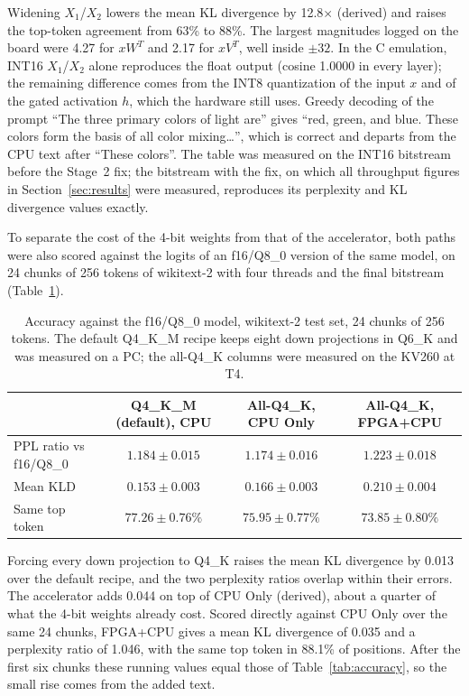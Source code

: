Widening $X_1$/$X_2$ lowers the mean KL divergence by 12.8$\times$ (derived) and raises
the top-token agreement from 63\% to 88\%. The largest magnitudes logged on the board
were 4.27 for $xW^T$ and 2.17 for $xV^T$, well inside $\pm 32$. In the C emulation,
INT16 $X_1$/$X_2$ alone reproduces the float output (cosine 1.0000 in every layer); the
remaining difference comes from the INT8 quantization of the input $x$ and of the gated
activation $h$, which the hardware still uses. Greedy decoding of the prompt ``The three
primary colors of light are'' gives ``red, green, and blue. These colors form the basis
of all color mixing\ldots'', which is correct and departs from the CPU text after
``These colors''. The table was measured on the INT16 bitstream before the Stage~2 fix;
the bitstream with the fix, on which all throughput figures in Section~\ref{sec:results}
were measured, reproduces its perplexity and KL divergence values exactly.

To separate the cost of the 4-bit weights from that of the accelerator, both paths were
also scored against the logits of an f16/Q8\_0 version of the same model, on 24 chunks of
256 tokens of wikitext-2 with four threads and the final bitstream
(Table~\ref{tab:accuracy_ref}).

\begin{table}[htbp]
\centering
\footnotesize
\caption{Accuracy against the f16/Q8\_0 model, wikitext-2 test set, 24 chunks of 256
tokens. The default Q4\_K\_M recipe keeps eight down projections in Q6\_K and was
measured on a PC; the all-Q4\_K columns were measured on the KV260 at T4.}
\label{tab:accuracy_ref}
\begin{tabular}{l c c c}
\hline
 & Q4\_K\_M (default), CPU & All-Q4\_K, CPU Only & All-Q4\_K, FPGA+CPU \\
\hline
PPL ratio vs f16/Q8\_0 & $1.184 \pm 0.015$ & $1.174 \pm 0.016$ & $1.223 \pm 0.018$ \\
Mean KLD               & $0.153 \pm 0.003$ & $0.166 \pm 0.003$ & $0.210 \pm 0.004$ \\
Same top token         & $77.26 \pm 0.76\%$ & $75.95 \pm 0.77\%$ & $73.85 \pm 0.80\%$ \\
\hline
\end{tabular}
\end{table}

Forcing every down projection to Q4\_K raises the mean KL divergence by 0.013 over the
default recipe, and the two perplexity ratios overlap within their errors. The
accelerator adds 0.044 on top of CPU Only (derived), about a quarter of what the 4-bit
weights already cost. Scored directly against CPU Only over the same 24 chunks, FPGA+CPU
gives a mean KL divergence of 0.035 and a perplexity ratio of 1.046, with the same top
token in 88.1\% of positions. After the first six chunks these running values equal
those of Table~\ref{tab:accuracy}, so the small rise comes from the added text.

